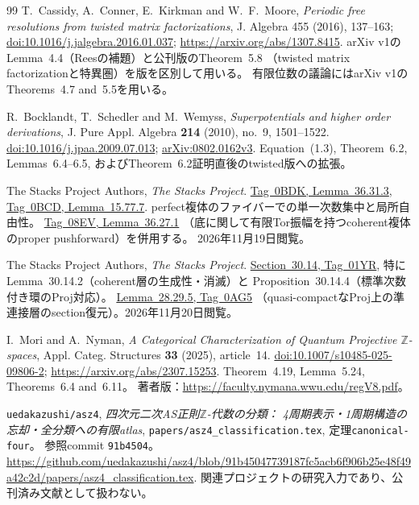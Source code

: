 \documentclass[11pt,a4paper]{ltjsarticle}
\numberwithin{equation}{section}
\begin{document}
\begin{thebibliography}{99}
T.~Cassidy, A.~Conner, E.~Kirkman and W.~F.~Moore,
\emph{Periodic free resolutions from twisted matrix factorizations},
J. Algebra 455 (2016), 137--163;
\href{https://doi.org/10.1016/j.jalgebra.2016.01.037}{doi:10.1016/j.jalgebra.2016.01.037};
\url{https://arxiv.org/abs/1307.8415}.
arXiv v1のLemma~4.4（Reesの補題）と公刊版のTheorem~5.8
（twisted matrix factorizationと特異圏）を版を区別して用いる。
有限位数の議論にはarXiv v1のTheorems~4.7 and~5.5を用いる。

R.~Bocklandt, T.~Schedler and M.~Wemyss,
\emph{Superpotentials and higher order derivations},
J. Pure Appl. Algebra \textbf{214} (2010), no.~9, 1501--1522.
\href{https://doi.org/10.1016/j.jpaa.2009.07.013}{doi:10.1016/j.jpaa.2009.07.013};
\href{https://arxiv.org/abs/0802.0162v3}{arXiv:0802.0162v3}.
Equation~(1.3), Theorem~6.2, Lemmas~6.4--6.5,
およびTheorem~6.2証明直後のtwisted版への拡張。

The Stacks Project Authors, \emph{The Stacks Project}.
\href{https://stacks.math.columbia.edu/tag/0BDK}{Tag~0BDK, Lemma~36.31.3},
\href{https://stacks.math.columbia.edu/tag/0BCD}{Tag~0BCD, Lemma~15.77.7}.
perfect複体のファイバーでの単一次数集中と局所自由性。
\href{https://stacks.math.columbia.edu/tag/08EV}{Tag~08EV, Lemma~36.27.1}
（底に関して有限Tor振幅を持つcoherent複体のproper pushforward）を併用する。
2026年11月19日閲覧。

The Stacks Project Authors, \emph{The Stacks Project}.
\href{https://stacks.math.columbia.edu/tag/01YR}{Section~30.14, Tag~01YR},
特にLemma~30.14.2（coherent層の生成性・消滅）と
Proposition~30.14.4（標準次数付き環のProj対応）。
\href{https://stacks.math.columbia.edu/tag/0AG5}{Lemma~28.29.5, Tag~0AG5}
（quasi-compactなProj上の準連接層のsection復元）。2026年11月20日閲覧。

I.~Mori and A.~Nyman,
\emph{A Categorical Characterization of Quantum Projective $\mathbb Z$-spaces},
Appl. Categ. Structures \textbf{33} (2025), article~14.
\href{https://doi.org/10.1007/s10485-025-09806-2}{doi:10.1007/s10485-025-09806-2};
\url{https://arxiv.org/abs/2307.15253}.
Theorem~4.19, Lemma~5.24, Theorems~6.4 and~6.11。
著者版：\url{https://faculty.nymana.wwu.edu/regV8.pdf}。

\texttt{uedakazushi/asz4},
\emph{四次元二次AS正則$\mathbb Z$-代数の分類：
4周期表示・1周期構造の忘却・全分類への有限atlas},
\nolinkurl{papers/asz4_classification.tex}, 定理\texttt{canonical-four}。
参照commit \texttt{91b4504}。
\url{https://github.com/uedakazushi/asz4/blob/91b45047739187fc5acb6f906b25e48f49a42c2d/papers/asz4_classification.tex}.
関連プロジェクトの研究入力であり、公刊済み文献として扱わない。


\end{thebibliography}
\end{document}
